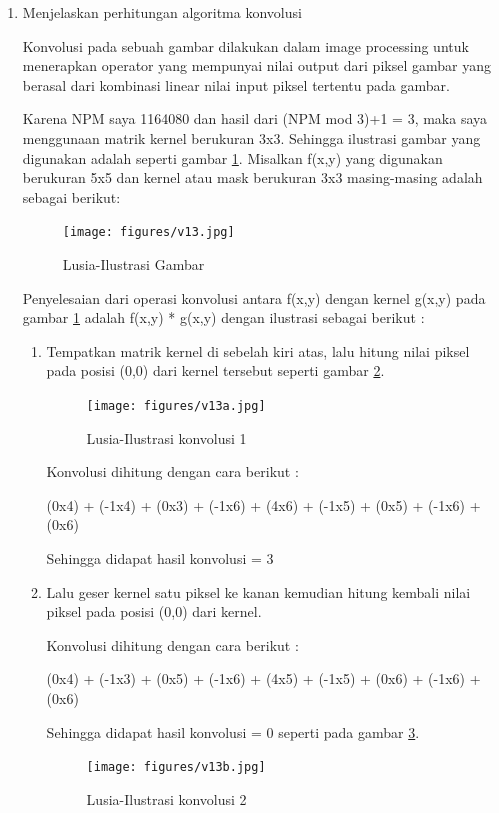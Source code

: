 \begin{enumerate}
\item Menjelaskan perhitungan algoritma konvolusi
	\par Konvolusi pada sebuah gambar dilakukan dalam image processing untuk menerapkan operator yang mempunyai nilai output dari piksel gambar yang berasal dari kombinasi linear nilai input piksel tertentu pada gambar. 
	\par Karena NPM saya 1164080 dan hasil dari (NPM mod 3)+1 = 3, maka saya menggunaan matrik kernel berukuran 3x3. Sehingga ilustrasi gambar yang digunakan adalah seperti gambar \ref{7A13}. Misalkan  f(x,y) yang digunakan berukuran 5x5 dan kernel atau mask berukuran 3x3 masing-masing adalah sebagai berikut: 
		\begin{figure}[!hbtp]
		\centering
		\texttt{[image: figures/v13.jpg]}
		\caption{Lusia-Ilustrasi Gambar}
		\label{7A13}
		\end{figure}
	\par Penyelesaian dari operasi konvolusi antara  f(x,y) dengan kernel g(x,y) pada gambar \ref{7A13} adalah  f(x,y) * g(x,y) dengan ilustrasi sebagai berikut :
	\begin{enumerate}
	\item Tempatkan matrik kernel di sebelah kiri atas, lalu hitung nilai piksel pada posisi (0,0) dari kernel tersebut seperti gambar \ref{7A13a}.
		\begin{figure}[!hbtp]
		\centering
		\texttt{[image: figures/v13a.jpg]}
		\caption{Lusia-Ilustrasi konvolusi 1}
		\label{7A13a}
		\end{figure}
		\par Konvolusi dihitung dengan cara berikut :
		\par (0x4) + (-1x4) + (0x3) + (-1x6) + (4x6) + (-1x5) + (0x5) + (-1x6) + (0x6)
		\par Sehingga didapat hasil konvolusi = 3
	\item Lalu geser kernel satu piksel ke kanan kemudian hitung kembali  nilai piksel pada posisi (0,0) dari kernel.
	\par Konvolusi dihitung dengan cara berikut :
	\par (0x4) + (-1x3) + (0x5) + (-1x6) + (4x5) + (-1x5) + (0x6) + (-1x6) + (0x6)  
	\par Sehingga didapat hasil konvolusi = 0 seperti pada gambar \ref{7A13b}.
		\begin{figure}[!hbtp]
		\centering
		\texttt{[image: figures/v13b.jpg]}
		\caption{Lusia-Ilustrasi konvolusi 2}
		\label{7A13b}
		\end{figure}
		

\end{enumerate}
\end{enumerate}
